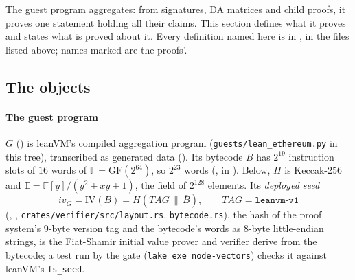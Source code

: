 \documentclass[11pt]{article}
\begin{document}
The guest program aggregates: from signatures, DA matrices and child proofs, it proves one statement
holding all their claims. This section defines what it proves and states what is proved about it.
Every definition named here is in , in the files listed above; names marked  are the proofs'.

\subsection{The objects}

\paragraph{The guest program} $G$ () is leanVM's compiled aggregation
program (\texttt{guests/lean\_ethereum.py} in this tree),
transcribed as generated data (). Its bytecode $B$ has $2^{19}$ instruction
slots of $16$ words of $\mathbb{F} = \mathrm{GF}(2^{64})$, so $2^{23}$ words
(, in ). Below, $H$ is Keccak-256 and
$\mathbb{E} = \mathbb{F}[y]/(y^2+xy+1)$, the field of $2^{128}$ elements. Its \emph{deployed seed}
\[
iv_G = \mathrm{IV}(B) = H(\mathit{TAG} \,\|\, \bar B), \qquad \mathit{TAG} = \texttt{leanvm-v1}
\]
(, , \texttt{crates/verifier/src/layout.rs},
\texttt{bytecode.rs}), the hash of the proof system's $9$-byte version tag and the bytecode's
words as $8$-byte little-endian strings, is the Fiat-Shamir initial value prover and verifier
derive from the bytecode; a test run by the gate (\texttt{lake exe node-vectors}) checks it against
leanVM's \texttt{fs\_seed}.
\end{document}

